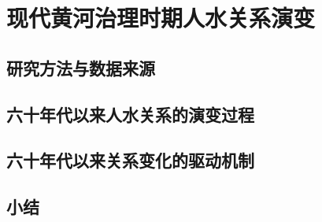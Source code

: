\chapter{现代黄河治理时期人水关系演变}\label{cha:4}


\section{研究方法与数据来源}\label{ch4:methods}


\section{六十年代以来人水关系的演变过程}\label{ch4:process}


\section{六十年代以来关系变化的驱动机制}\label{ch4:mechanism}




\section{小结}\label{ch4:summary}

